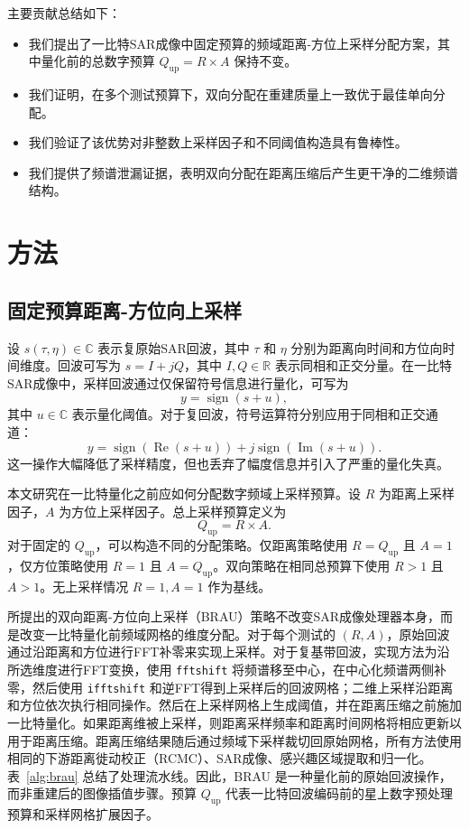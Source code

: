 \documentclass[conference]{IEEEtran}
\begin{document}
主要贡献总结如下：
\begin{itemize}
    \item 我们提出了一比特SAR成像中固定预算的频域距离-方位上采样分配方案，其中量化前的总数字预算 $Q_{\mathrm{up}}=R\times A$ 保持不变。
    \item 我们证明，在多个测试预算下，双向分配在重建质量上一致优于最佳单向分配。
    \item 我们验证了该优势对非整数上采样因子和不同阈值构造具有鲁棒性。
    \item 我们提供了频谱泄漏证据，表明双向分配在距离压缩后产生更干净的二维频谱结构。
\end{itemize}

\section{方法}

\subsection{固定预算距离-方位向上采样}

设 $s(\tau,\eta)\in\mathbb{C}$ 表示复原始SAR回波，其中 $\tau$ 和 $\eta$ 分别为距离向时间和方位向时间维度。回波可写为 $s=I+jQ$，其中 $I,Q\in\mathbb{R}$ 表示同相和正交分量。在一比特SAR成像中，采样回波通过仅保留符号信息进行量化，可写为
\begin{equation}
    y = \operatorname{sign}(s + u),
\end{equation}
其中 $u\in\mathbb{C}$ 表示量化阈值。对于复回波，符号运算符分别应用于同相和正交通道：
\begin{equation}
    y=\operatorname{sign}(\operatorname{Re}(s+u))
    +j\operatorname{sign}(\operatorname{Im}(s+u)).
\end{equation}
这一操作大幅降低了采样精度，但也丢弃了幅度信息并引入了严重的量化失真。

本文研究在一比特量化之前应如何分配数字频域上采样预算。设 $R$ 为距离上采样因子，$A$ 为方位上采样因子。总上采样预算定义为
\begin{equation}
    Q_{\mathrm{up}} = R \times A .
\end{equation}
对于固定的 $Q_{\mathrm{up}}$，可以构造不同的分配策略。仅距离策略使用 $R=Q_{\mathrm{up}}$ 且 $A=1$，仅方位策略使用 $R=1$ 且 $A=Q_{\mathrm{up}}$。双向策略在相同总预算下使用 $R>1$ 且 $A>1$。无上采样情况 $R=1,A=1$ 作为基线。

所提出的双向距离-方位向上采样（BRAU）策略不改变SAR成像处理器本身，而是改变一比特量化前频域网格的维度分配。对于每个测试的 $(R,A)$，原始回波通过沿距离和方位进行FFT补零来实现上采样。对于复基带回波，实现方法为沿所选维度进行FFT变换，使用 \texttt{fftshift} 将频谱移至中心，在中心化频谱两侧补零，然后使用 \texttt{ifftshift} 和逆FFT得到上采样后的回波网格；二维上采样沿距离和方位依次执行相同操作。然后在上采样网格上生成阈值，并在距离压缩之前施加一比特量化。如果距离维被上采样，则距离采样频率和距离时间网格将相应更新以用于距离压缩。距离压缩结果随后通过频域下采样裁切回原始网格，所有方法使用相同的下游距离徙动校正（RCMC）、SAR成像、感兴趣区域提取和归一化。表~\ref{alg:brau} 总结了处理流水线。因此，BRAU 是一种量化前的原始回波操作，而非重建后的图像插值步骤。预算 $Q_{\mathrm{up}}$ 代表一比特回波编码前的星上数字预处理预算和采样网格扩展因子。
\end{document}
